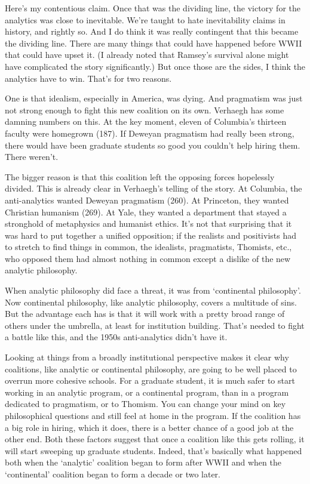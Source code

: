 \documentclass[
  11pt,
  letterpaper,
  DIV=11,
  numbers=noendperiod,
  twoside]{scrartcl}
\begin{document}
Here's my contentious claim. Once that was the dividing line, the
victory for the analytics was close to inevitable. We're taught to hate
inevitability claims in history, and rightly so. And I do think it was
really contingent that this became the dividing line. There are many
things that could have happened before WWII that could have upset it. (I
already noted that Ramsey's survival alone might have complicated the
story significantly.) But once those are the sides, I think the
analytics have to win. That's for two reasons.

One is that idealism, especially in America, was dying. And pragmatism
was just not strong enough to fight this new coalition on its own.
Verhaegh has some damning numbers on this. At the key moment, eleven of
Columbia's thirteen faculty were homegrown (187). If Deweyan pragmatism
had really been strong, there would have been graduate students so good
you couldn't help hiring them. There weren't.

The bigger reason is that this coalition left the opposing forces
hopelessly divided. This is already clear in Verhaegh's telling of the
story. At Columbia, the anti-analytics wanted Deweyan pragmatism (260).
At Princeton, they wanted Christian humanism (269). At Yale, they wanted
a department that stayed a stronghold of metaphysics and humanist
ethics. It's not that surprising that it was hard to put together a
unified opposition; if the realists and positivists had to stretch to
find things in common, the idealists, pragmatists, Thomists, etc., who
opposed them had almost nothing in common except a dislike of the new
analytic philosophy.

When analytic philosophy did face a threat, it was from `continental
philosophy'. Now continental philosophy, like analytic philosophy,
covers a multitude of sins. But the advantage each has is that it will
work with a pretty broad range of others under the umbrella, at least
for institution building. That's needed to fight a battle like this, and
the 1950s anti-analytics didn't have it.

Looking at things from a broadly institutional perspective makes it
clear why coalitions, like analytic or continental philosophy, are going
to be well placed to overrun more cohesive schools. For a graduate
student, it is much safer to start working in an analytic program, or a
continental program, than in a program dedicated to pragmatism, or to
Thomism. You can change your mind on key philosophical questions and
still feel at home in the program. If the coalition has a big role in
hiring, which it does, there is a better chance of a good job at the
other end. Both these factors suggest that once a coalition like this
gets rolling, it will start sweeping up graduate students. Indeed,
that's basically what happened both when the `analytic' coalition began
to form after WWII and when the `continental' coalition began to form a
decade or two later.
\end{document}
